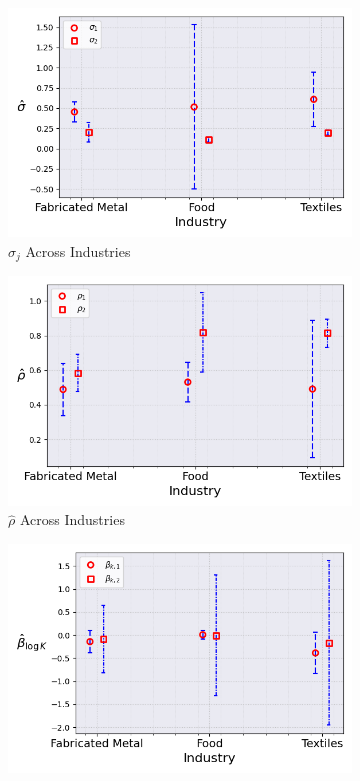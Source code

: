 \documentclass{article}
\begin{document}
\begin{figure}[ht!]
\begin{subfigure}[t]{0.32\textwidth}
        \centering
        \includegraphics[width=\textwidth]{figure/ar1_normal_kmshare_ciiu_sigma_across_industries_m2.png}
        \caption{$\hat\sigma_j$ Across Industries}
    \end{subfigure}
    \begin{subfigure}[t]{0.32\textwidth}
        \centering
        \includegraphics[width=\textwidth]{figure/ar1_normal_kmshare_ciiu_rho_across_industries_m2.png}
        \caption{$\hat\rho$ Across Industries}
    \end{subfigure}
    \begin{subfigure}[t]{0.32\textwidth}
        \centering
        \includegraphics[width=\textwidth]{figure/ar1_normal_kmshare_ciiu_beta_k_across_industries_m2.png}

\end{subfigure}
\end{figure}
\end{document}
